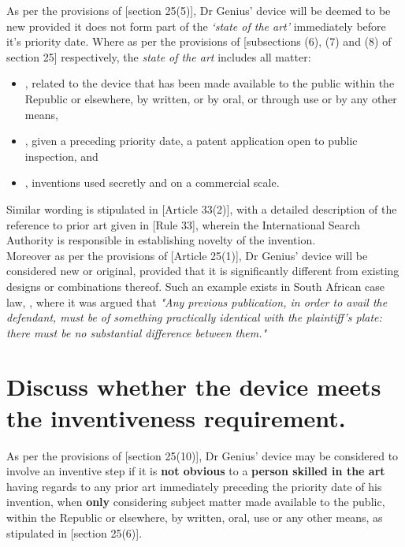 \documentclass[11pt]{article}
\begin{document}
As per the provisions of [section 25(5)]\cite{rsa78_patents_act}, Dr Genius'
device will be deemed to be new provided it does not form part of the \emph{`state of
the art'} immediately before it's priority date. Where as per the provisions of
[subsections (6), (7) and (8) of section 25]\cite{rsa78_patents_act} respectively,
the \emph{state of the art} includes all matter:
\begin{itemize}
\item\relax [subsection (6)], related to the device that has been made available to the public within the Republic or elsewhere, by written, or by oral, or through use or by any other means,
\item\relax [subsection (7)], given a preceding priority date, a patent application open to public inspection, and
\item\relax [subsection (8)], inventions used secretly and on a commercial scale.
\end{itemize}

Similar wording is stipulated in [Article 33(2)]\cite{wipo70_pct}, with a detailed description of the reference to prior art given in [Rule 33]\cite{wipo70_pct_reg}, wherein the International Search Authority is responsible in establishing novelty of the invention.\\

Moreover as per the provisions of [Article 25(1)]\cite{wto17_trips}, Dr Genius' device will be considered new or original, provided that it is significantly different from existing designs or combinations thereof. Such an example exists in South African case law,  \cite{davis42_levin_v_numplates}, where it was argued that \emph{"Any previous publication, in order to avail the defendant, must be of something practically identical with the plaintiff's plate: there must be no substantial difference between them."}

\section{Discuss whether the device meets the inventiveness requirement.}
\label{sec:orgf25e0bc}
\label{sec:inventiveness}

As per the provisions of [section 25(10)]\cite{rsa78_patents_act}, Dr Genius' device may be considered to involve an inventive step if it is \textbf{not obvious} to a \textbf{person skilled in the art} having regards to any prior art immediately preceding the priority date of his invention, when \textbf{only} considering subject matter made available to the public, within the Republic or elsewhere, by written, oral, use or any other means, as stipulated in [section 25(6)]\cite{rsa78_patents_act}.\\
\end{document}
